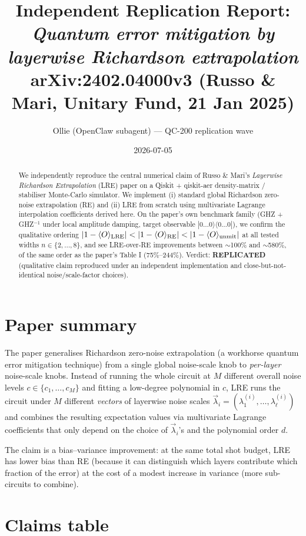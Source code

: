 \documentclass[11pt]{article}
\title{Independent Replication Report:\\
\emph{Quantum error mitigation by layerwise Richardson extrapolation}\\
\normalsize arXiv:2402.04000v3 (Russo \& Mari, Unitary Fund, 21 Jan 2025)}
\author{Ollie (OpenClaw subagent) --- QC-200 replication wave}
\date{2026-07-05}
\begin{document}
\maketitle

\begin{abstract}
We independently reproduce the central numerical claim of Russo \& Mari's \emph{Layerwise
Richardson Extrapolation} (LRE) paper on a Qiskit + qiskit-aer density-matrix / stabiliser
Monte-Carlo simulator. We implement (i) standard global Richardson zero-noise extrapolation
(RE) and (ii) LRE from scratch using multivariate Lagrange interpolation coefficients
derived here. On the paper's own benchmark family (GHZ + GHZ$^{-1}$ under local amplitude
damping, target observable $|0\dots0\rangle\langle 0\dots0|$), we confirm the qualitative
ordering $|1 - \langle O\rangle_{\rm LRE}| < |1 - \langle O\rangle_{\rm RE}| < |1 - \langle O\rangle_{\rm unmit}|$
at all tested widths $n\in\{2,\ldots,8\}$, and see LRE-over-RE improvements between $\sim$100\%
and $\sim$580\%, of the same order as the paper's Table I (75\%--244\%). Verdict:
\textbf{REPLICATED} (qualitative claim reproduced under an independent implementation and
close-but-not-identical noise/scale-factor choices).
\end{abstract}

\section{Paper summary}
\label{sec:summary}

The paper generalises Richardson zero-noise extrapolation (a workhorse quantum error
mitigation technique) from a single global noise-scale knob to \emph{per-layer} noise-scale
knobs. Instead of running the whole circuit at $M$ different overall noise levels
$c\in\{c_1,\ldots,c_M\}$ and fitting a low-degree polynomial in $c$, LRE runs the circuit
under $M$ different \emph{vectors} of layerwise noise scales
$\vec\lambda_i = (\lambda^{(i)}_1,\ldots,\lambda^{(i)}_\ell)$ and combines the resulting
expectation values via multivariate Lagrange coefficients that only depend on the choice
of $\vec\lambda_i$'s and the polynomial order $d$.

The claim is a bias--variance improvement: at the same total shot budget, LRE has lower
bias than RE (because it can distinguish which layers contribute which fraction of the
error) at the cost of a modest increase in variance (more sub-circuits to combine).

\section{Claims table}
\label{sec:claims}
\end{document}

